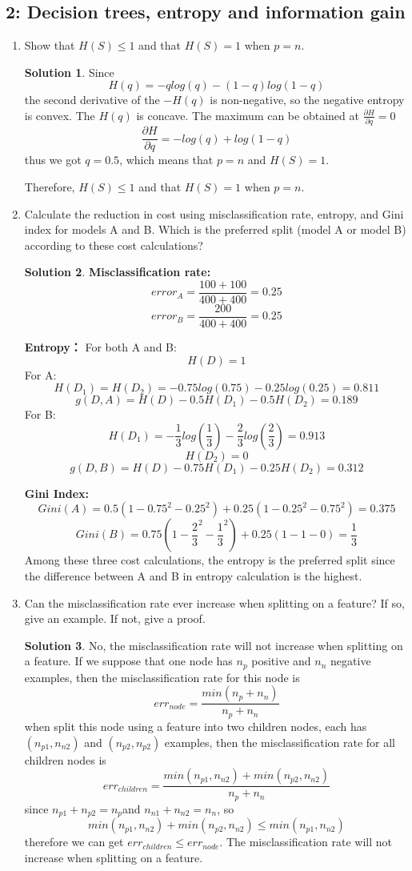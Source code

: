 \documentclass[]{book}
\theoremstyle{definition}
\newtheorem*{soln}{Solution}
\begin{document}
\subsection*{2: Decision trees, entropy and information gain }
	\begin{enumerate}
		\item  Show that $H(S) ≤ 1$ and that $H(S) = 1$ when $p = n$.
		\begin{soln}
			Since
			$$H(q) = - q log(q)- (1-q)log(1-q)$$
			the second derivative of the $-H(q)$ is non-negative, so the negative entropy is convex. The $H(q)$ is concave. The maximum can be obtained at $\frac{\partial H }{\partial q } = 0$
			$$\frac{\partial H }{\partial q } = -log(q) +log(1-q)$$
			thus we got $q = 0.5$, which means that $p = n$ and $H(S) = 1$.
			
			Therefore, $H(S) ≤ 1$ and that $H(S) = 1$ when $p = n$.
			
		\end{soln}
		\item Calculate the reduction in cost using misclassification rate, entropy, and Gini index for models A and B. Which is the preferred split (model A or model B) according to these cost calculations?
		\begin{soln}
			\textbf{Misclassification rate:}
			$$error_A = \frac{100 + 100 }{400+400} = 0.25$$
			$$error_B = \frac{200}{400+400} = 0.25$$ 
			
			\textbf{Entropy：} 
			For both A and B:
			$$H(D) = 1$$
			For A:
			$$H(D_1) =H(D_2) =  - 0.75 log(0.75) - 0.25log(0.25) = 0.811$$
			$$g(D,A) = H(D) -0.5H(D_1) - 0.5H(D_2) = 0.189$$
			For B:
			$$H(D_1) = - \frac{1}{3}log(\frac{1}{3}) - \frac{2}{3}log(\frac{2}{3}) = 0.913$$
			$$H(D_2)= 0$$
			$$g(D,B) = H(D)-0.75H(D_1)-0.25H(D_2) = 0.312$$
			
			\textbf{Gini Index:}
			$$Gini(A) = 0.5(1-0.75^2 - 0.25^2) + 0.25(1-0.25^2 - 0.75^2) = 0.375$$
			$$Gini(B) = 0.75(1-\frac{2}{3}^2 - \frac{1}{3}^2)+0.25(1-1-0)=\frac{1}{3}$$
			Among these three cost calculations, the entropy is the preferred split since the difference between A and B in entropy calculation is the highest.
		\end{soln}
		\item Can the misclassification rate ever increase when splitting on a feature? If so, give an example. If not, give a proof.
		\begin{soln}
			No, the misclassification rate will not increase when splitting on a feature.
			If we suppose that one node has $n_p$ positive and $n_n$ negative examples, then the misclassification rate for this node is 
			$$err_{node} = \frac{min(n_p + n_n)}{n_p+n_n}$$
			when split this node using a feature into two children nodes, each has $(n_{p1},n_{n2})$ and $(n_{p2},n_{p2})$ examples, then the misclassification rate for all children nodes is
			$$err_{children} = \frac{min(n_{p1},n_{n2})+min(n_{p2},n_{n2})}{n_p+n_n}$$
			since $n_{p1} + n_{p2} = n_p$and $n_{n1} +n_{n2} = n_n$, so 
			$$min(n_{p1},n_{n2})+min(n_{p2},n_{n2})\leq min(n_{p1},n_{n2})$$
			therefore we can get $err_{children} \leq err_{node}$. The misclassification rate will not increase when splitting on a feature.
		\end{soln}
	\end{enumerate}
\end{document}
